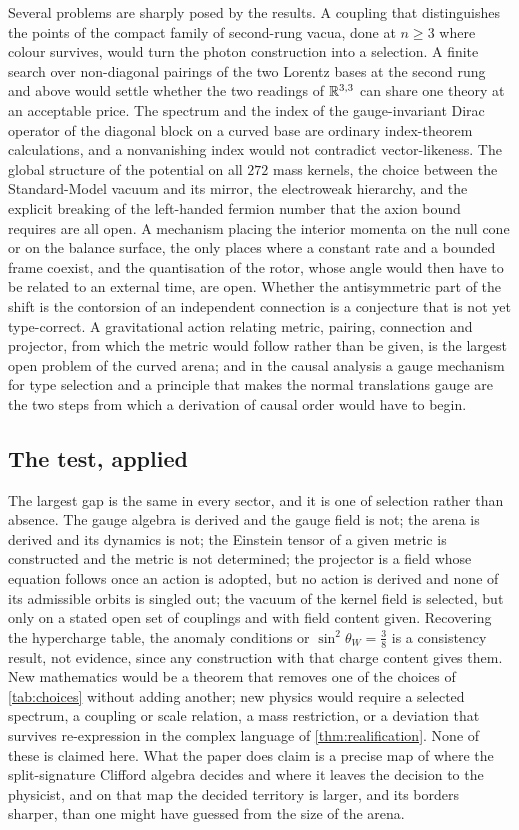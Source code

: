 Several problems are sharply posed by the results. A coupling that distinguishes the points of the compact family of second-rung vacua, done at $n\ge3$ where colour
survives, would turn the photon construction into a selection. A finite search over non-diagonal pairings of the two Lorentz bases at the second rung and above would settle
whether the two readings of $\mathbb{R}^{3,3}$ can share one theory at an acceptable price. The spectrum and the index of the gauge-invariant Dirac operator of the diagonal block on
a curved base are ordinary index-theorem calculations, and a nonvanishing index would not contradict vector-likeness. The global structure of the potential on all $272$ mass
kernels, the choice between the Standard-Model vacuum and its mirror, the electroweak hierarchy, and the explicit breaking of the left-handed fermion number that the axion
bound requires are all open. A mechanism placing the interior momenta on the null cone or on the balance surface, the only places where a constant rate and a bounded frame
coexist, and the quantisation of the rotor, whose angle would then have to be related to an external time, are open. Whether the antisymmetric part of the shift is the
contorsion of an independent connection is a conjecture that is not yet type-correct. A gravitational action relating metric, pairing, connection and projector, from which
the metric would follow rather than be given, is the largest open problem of the curved arena; and in the causal analysis a gauge mechanism for type selection and a principle
that makes the normal translations gauge are the two steps from which a derivation of causal order would have to begin.

\subsection{The test, applied}

The largest gap is the same in every sector, and it is one of selection rather than absence. The gauge algebra is derived and the gauge field is not; the arena is derived
and its dynamics is not; the Einstein tensor of a given metric is constructed and the metric is not determined; the projector is a field whose equation follows once an action
is adopted, but no action is derived and none of its admissible orbits is singled out; the vacuum of the kernel field is selected, but only on a stated open set of couplings
and with field content given. Recovering the hypercharge table, the anomaly conditions or $\sin^2\theta_W=\tfrac38$ is a consistency result, not evidence, since any construction
with that charge content gives them. New mathematics would be a theorem that removes one of the choices of \cref{tab:choices} without adding another; new physics would require
a selected spectrum, a coupling or scale relation, a mass restriction, or a deviation that survives re-expression in the complex language of \cref{thm:realification}. None of
these is claimed here. What the paper does claim is a precise map of where the split-signature Clifford algebra decides and where it leaves the decision to the physicist,
and on that map the decided territory is larger, and its borders sharper, than one might have guessed from the size of the arena.
